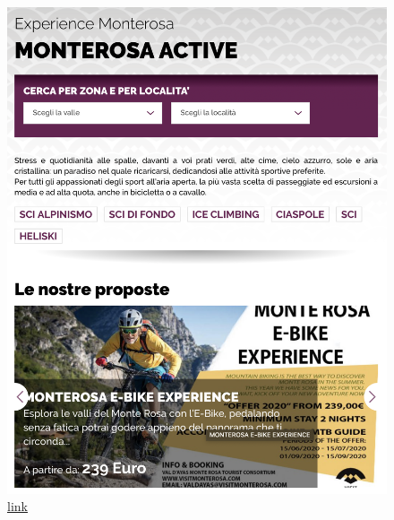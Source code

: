 \documentclass[a4paper, 11pt, parskip=half, headsepline]{scrreprt}
\begin{document}
\begin{figure}[H]
    \begin{minipage}[t]{0.5\textwidth}
        \centering
        \includegraphics[width=1\linewidth, keepaspectratio]{11-interaction-consistency}
        \caption{\href{https://www.visitmonterosa.com/experience-monterosa/monterosa-active/}{link}}
        \label{fig:interaction-consistency-01}
    \end{minipage}   
    \hspace*{\fill}
    \begin{minipage}[t]{0.5\textwidth}
        \centering

\end{minipage}
\end{figure}
\end{document}
